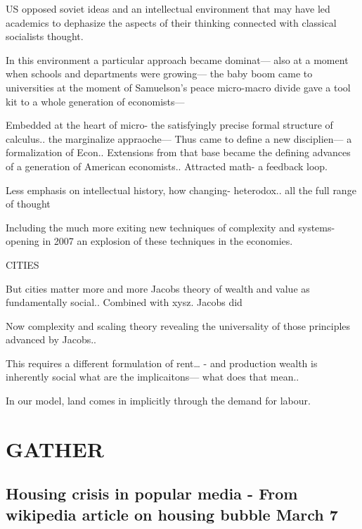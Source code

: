 US opposed soviet ideas and an intellectual environment that may have led academics to dephasize the aspects of their thinking connected with classical socialists thought. 

In this environment a particular approach became dominat--- also at a moment when schools and departments were growing--- the baby boom came to universities at the moment of Samuelson's peace micro-macro divide gave a tool kit to a whole generation of economists--- 

Embedded at the heart of micro- the satisfyingly precise formal structure of calculus.. the marginalize appraoche--- 
Thus came to define a new disciplien--- a formalization of Econ.. 
Extensions from that base became the defining advances of a generation of American economists..
Attracted math- a feedback loop.

Less emphasis on intellectual history, how changing- heterodox.. all the full range of thought

Including the much more exiting new techniques of complexity and systems- opening in 2007 an explosion of these techniques in the economies. 


CITIES

But cities matter more and more
Jacobs theory of wealth and value as fundamentally social.. 
Combined with xysz. Jacobs did

Now complexity and scaling theory revealing the universality of those principles advanced by Jacobs..

This requires a different formulation of rent… - and production wealth is inherently social what are the implicaitons--- what does that mean.. 



In our model, land comes in implicitly through the demand for labour. 



\chapter{GATHER}
\section{Housing crisis in popular media - From wikipedia article on housing bubble March 7}


